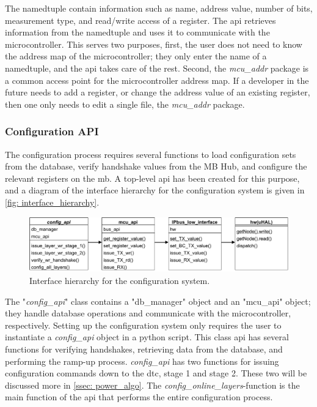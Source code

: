 \documentclass[main.tex]{subfiles}
\begin{document}
The namedtuple contain information such as name, address value, number of bits, measurement type, and read/write access of a register. The \gls{api} retrieves information from the namedtuple and uses it to communicate with the microcontroller. This serves two purposes, first, the user does not need to know the address map of the microcontroller; they only enter the name of a namedtuple, and the \gls{api} takes care of the rest. Second, the \textit{mcu\_addr} package is a common access point for the microcontroller address map. If a developer in the future needs to add a register, or change the address value of an existing register, then one only needs to edit a single file, the \textit{mcu\_addr} package.


\subsubsection{Configuration API}
\label{ssec: conf_api}
The configuration process requires several functions to load configuration sets from the database, verify handshake values from the MB Hub, and configure the relevant registers on the \gls{mb}. A top-level \gls{api} has been created for this purpose, and a diagram of the interface hierarchy for the configuration system is given in \autoref{fig: interface_hierarchy}.


\begin{figure}[!ht]
    \centering
    \includegraphics[width=15cm, scale=4]{images/interface_hierarchy.pdf}
    \caption{Interface hierarchy for the configuration system.}
    \label{fig: interface_hierarchy}
\end{figure}
\FloatBarrier

The "\textit{config\_api}" class contains a "db\_manager" object and an "mcu\_api" object; they handle database operations and communicate with the microcontroller, respectively. Setting up the configuration system only requires the user to instantiate a \textit{config\_api} object in a python script. This class \gls{api} has several functions for verifying handshakes, retrieving data from the database, and performing the ramp-up process. \textit{config\_api} has two functions for issuing configuration commands down to the \gls{dtc}, stage 1 and stage 2. These two will be discussed more in \autoref{ssec: power_algo}. The \textit{config\_online\_layers}-function is the main function of the \gls{api} that performs the entire configuration process.
\end{document}
